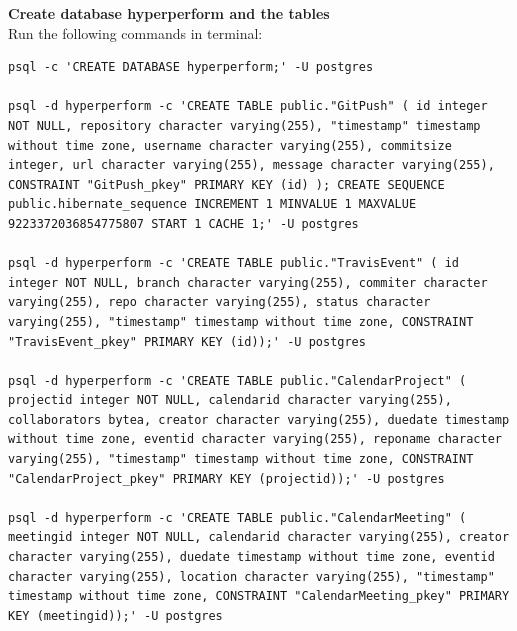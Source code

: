 \documentclass[11pt,a4paper]{article}
\begin{document}
\textbf{Create database hyperperform and the tables}\\
Run the following commands in terminal: 
\begin{lstlisting}
psql -c 'CREATE DATABASE hyperperform;' -U postgres

psql -d hyperperform -c 'CREATE TABLE public."GitPush" ( id integer NOT NULL, repository character varying(255), "timestamp" timestamp without time zone, username character varying(255), commitsize integer, url character varying(255), message character varying(255), CONSTRAINT "GitPush_pkey" PRIMARY KEY (id) ); CREATE SEQUENCE public.hibernate_sequence INCREMENT 1 MINVALUE 1 MAXVALUE 9223372036854775807 START 1 CACHE 1;' -U postgres

psql -d hyperperform -c 'CREATE TABLE public."TravisEvent" ( id integer NOT NULL, branch character varying(255), commiter character varying(255), repo character varying(255), status character varying(255), "timestamp" timestamp without time zone, CONSTRAINT "TravisEvent_pkey" PRIMARY KEY (id));' -U postgres

psql -d hyperperform -c 'CREATE TABLE public."CalendarProject" ( projectid integer NOT NULL, calendarid character varying(255), collaborators bytea, creator character varying(255), duedate timestamp without time zone, eventid character varying(255), reponame character varying(255), "timestamp" timestamp without time zone, CONSTRAINT "CalendarProject_pkey" PRIMARY KEY (projectid));' -U postgres

psql -d hyperperform -c 'CREATE TABLE public."CalendarMeeting" ( meetingid integer NOT NULL, calendarid character varying(255), creator character varying(255), duedate timestamp without time zone, eventid character varying(255), location character varying(255), "timestamp" timestamp without time zone, CONSTRAINT "CalendarMeeting_pkey" PRIMARY KEY (meetingid));' -U postgres

\end{lstlisting}
\pagebreak
\end{document}
